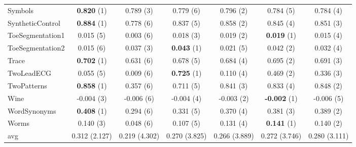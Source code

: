 \begin{table}[ht]
\begin{adjustbox}{width=\textwidth}
\begin{tabular}{lcccccc}
    Symbols & \textbf{0.820} (1) & 0.789 (3) & 0.779 (6) & 0.796 (2) & 0.784 (5) & 0.784 (4) \\
    SyntheticControl & \textbf{0.884} (1) & 0.778 (6) & 0.837 (5) & 0.858 (2) & 0.845 (4) & 0.851 (3) \\
    ToeSegmentation1 & 0.015 (5) & 0.003 (6) & 0.018 (3) & 0.019 (2) & \textbf{0.019} (1) & 0.015 (4) \\
    ToeSegmentation2 & 0.015 (6) & 0.037 (3) & \textbf{0.043} (1) & 0.021 (5) & 0.042 (2) & 0.032 (4) \\
    Trace & \textbf{0.702} (1) & 0.631 (6) & 0.678 (5) & 0.684 (4) & 0.695 (2) & 0.691 (3) \\
    TwoLeadECG & 0.055 (5) & 0.009 (6) & \textbf{0.725} (1) & 0.110 (4) & 0.469 (2) & 0.336 (3) \\
    TwoPatterns & \textbf{0.858} (1) & 0.357 (6) & 0.711 (5) & 0.841 (3) & 0.833 (4) & 0.848 (2) \\
    Wine & -0.004 (3) & -0.006 (6) & -0.004 (4) & -0.003 (2) & \textbf{-0.002} (1) & -0.006 (5) \\
    WordSynonyms & \textbf{0.408} (1) & 0.294 (6) & 0.331 (5) & 0.370 (4) & 0.381 (3) & 0.389 (2) \\
    Worms & 0.140 (3) & 0.048 (6) & 0.107 (5) & 0.131 (4) & \textbf{0.141} (1) & 0.140 (2) \\
    \hline 
    avg & 0.312 (2.127) & 0.219 (4.302) & 0.270 (3.825) & 0.266 (3.889) & 0.272 (3.746) & 0.280 (3.111) \\ 
    \hline
    \end{tabular}
    \end{adjustbox}
    \end{table}
    
    
    
